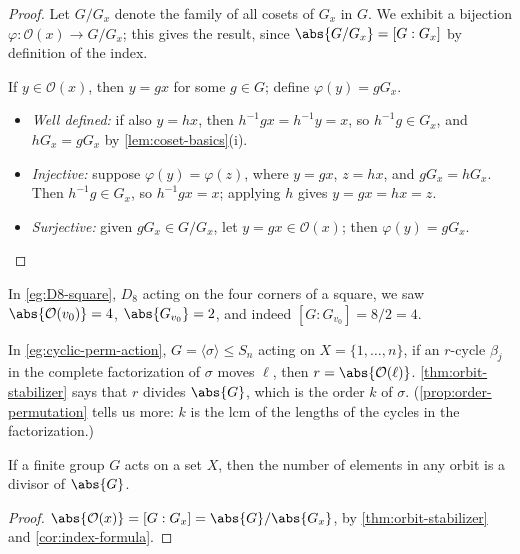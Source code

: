 \begin{proof}
	Let \(G/G_x\) denote the family of all cosets of \(G_x\) in \(G\). We exhibit a
	bijection \(\varphi\colon \mathcal O(x) \to G/G_x\); this gives the result, since
	\(\abs{G/G_x} = [G : G_x]\) by definition of the index.

	If \(y \in \mathcal O(x)\), then \(y = gx\) for some \(g \in G\); define
	\(\varphi(y) = gG_x\).
	\begin{itemize}
		\item \emph{Well defined:} if also \(y = hx\), then \(h^{-1}gx = h^{-1}y = x\), so
		      \(h^{-1}g \in G_x\), and \(hG_x = gG_x\) by \autoref{lem:coset-basics}(i).
		\item \emph{Injective:} suppose \(\varphi(y) = \varphi(z)\), where \(y = gx\),
		      \(z = hx\), and \(gG_x = hG_x\). Then \(h^{-1}g \in G_x\), so
		      \(h^{-1}gx = x\); applying \(h\) gives \(y = gx = hx = z\).
		\item \emph{Surjective:} given \(gG_x \in G/G_x\), let \(y = gx \in \mathcal O(x)\);
		      then \(\varphi(y) = gG_x\). \qedhere
	\end{itemize}
\end{proof}

\begin{eg}
	In \autoref{eg:D8-square}, \(D_8\) acting on the four corners of a square, we saw
	\(\abs{\mathcal O(v_0)} = 4\), \(\abs{G_{v_0}} = 2\), and indeed
	\([G : G_{v_0}] = 8/2 = 4\).

	In \autoref{eg:cyclic-perm-action}, \(G = \langle\sigma\rangle \leq S_n\) acting on
	\(X = \{1, \dots, n\}\), if an \(r\)-cycle \(\beta_j\) in the complete factorization of
	\(\sigma\) moves \(\ell\), then \(r = \abs{\mathcal O(\ell)}\).
	\autoref{thm:orbit-stabilizer} says that \(r\) divides \(\abs{G}\), which is the order
	\(k\) of \(\sigma\). (\autoref{prop:order-permutation} tells us more: \(k\) is the lcm
	of the lengths of the cycles in the factorization.)
\end{eg}

\begin{corollary}\label{cor:orbit-divides}
	If a finite group \(G\) acts on a set \(X\), then the number of elements in any orbit
	is a divisor of \(\abs{G}\).
\end{corollary}

\begin{proof}
	\(\abs{\mathcal O(x)} = [G : G_x] = \abs{G}/\abs{G_x}\), by
	\autoref{thm:orbit-stabilizer} and \autoref{cor:index-formula}.
\end{proof}

